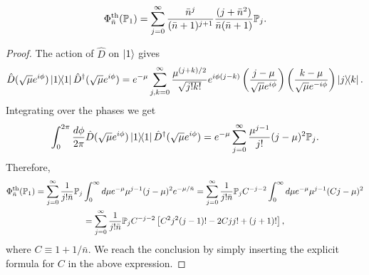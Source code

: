 \documentclass[a4paper]{report}
\newcommand{\PP}{\mathbb{P}}
\begin{document}
\begin{prop}
	\begin{equation}
		\Phi^{\rm th}_{\bar n}(\PP_1)
		= \sum_{j=0}^\infty
			\frac{ \bar n^j }{ (\bar n+1)^{j+1} }
			\frac{ (j+ \bar n^2) }{ \bar n(\bar n + 1) }
			\PP_j.
	\end{equation}
	\label{prop:thermalisation_of_P1}
\end{prop}
\begin{proof}
	The action of $\hat D$ on $\ket1$ gives
	\begin{equation}
		\hat D(\sqrt\mu e^{i\phi})\ketbra1 \hat D^\dagger(\sqrt\mu e^{i\phi})
		= e^{-\mu} \sum_{j,k=0}^\infty \frac{\mu^{(j+k)/2}}{\sqrt{j!k!}} e^{i\phi(j-k)}
		\left(\frac{j-\mu}{\sqrt\mu e^{i\phi}}\right)
		\left(\frac{k-\mu}{\sqrt\mu e^{-i\phi}}\right)
		\ketbra{j}{k}.
	\end{equation}
	Integrating over the phases we get
	\begin{equation}
		\int_0^{2\pi} \frac{d\phi}{2\pi}
		\hat D(\sqrt\mu e^{i\phi})\ketbra1 \hat D^\dagger(\sqrt\mu e^{i\phi})
		= e^{-\mu} \sum_{j=0}^\infty \frac{\mu^{j-1}}{j!} (j-\mu)^2 \PP_j.
	\end{equation}
	Therefore,
	\begin{equation}
	\begin{gathered}
		\Phi_{\bar n}^{\rm th}(\PP_1)
		= \sum_{j=0}^\infty \frac{1}{j!\bar n}\PP_j \int_0^\infty d\mu
		e^{-\mu} \mu^{j-1} (j-\mu)^2 e^{-\mu/\bar n}
		= \sum_{j=0}^\infty \frac{1}{j!\bar n}\PP_j
		C^{-j-2} \int_0^\infty d\mu
		e^{-\mu} \mu^{j-1} (C j-\mu)^2 \\
		= \sum_{j=0}^\infty \frac{1}{j!\bar n}\PP_j
		C^{-j-2} \left[
			C^2 j^2 (j-1)! - 2C j j! + (j+1)!
		\right],
	\end{gathered}
	\end{equation}
	where $C\equiv 1+1/\bar n$.
	We reach the conclusion by simply inserting the explicit formula for $C$ in the above expression.
\end{proof}
\end{document}
